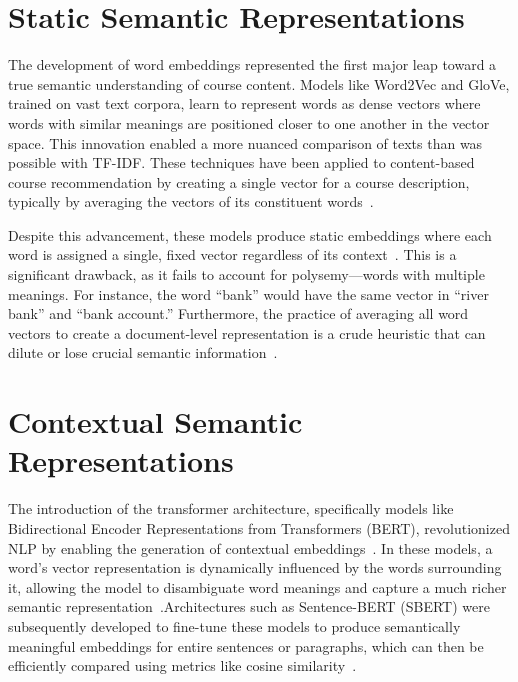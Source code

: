 \section{Static Semantic Representations}\label{ch:2.2}
The development of word embeddings represented the first major leap toward a true semantic understanding of course content.  Models like Word2Vec and GloVe, trained on vast text corpora, learn to represent words as dense vectors where words with similar meanings are positioned closer to one another in the vector space.  This innovation enabled a more nuanced comparison of texts than was possible with TF-IDF.  These techniques have been applied to content-based course recommendation by creating a single vector for a course description, typically by averaging the vectors of its constituent words~\cite{pardos10.1145/3330430.3333622}.

Despite this advancement, these models produce static embeddings where each word is assigned a single, fixed vector regardless of its context~\cite{devlin2019bertpretrainingdeepbidirectional}.  This is a significant drawback, as it fails to account for polysemy---words with multiple meanings.  For instance, the word ``bank'' would have the same vector in ``river bank'' and ``bank account.'' Furthermore, the practice of averaging all word vectors to create a document-level representation is a crude heuristic that can dilute or lose crucial semantic information~\cite{reimers-2019-sentence-bert}.

\section{Contextual Semantic Representations}\label{ch:2.3}
The introduction of the transformer architecture, specifically models like Bidirectional Encoder Representations from Transformers (BERT), revolutionized NLP by enabling the generation of contextual embeddings~\cite{devlin2019bertpretrainingdeepbidirectional}.  In these models, a word's vector representation is dynamically influenced by the words surrounding it, allowing the model to disambiguate word meanings and capture a much richer semantic representation~\cite{devlin2019bertpretrainingdeepbidirectional}.Architectures such as Sentence-BERT (SBERT) were subsequently developed to fine-tune these models to produce semantically meaningful embeddings for entire sentences or paragraphs, which can then be efficiently compared using metrics like cosine similarity~\cite{reimers-2019-sentence-bert}.

